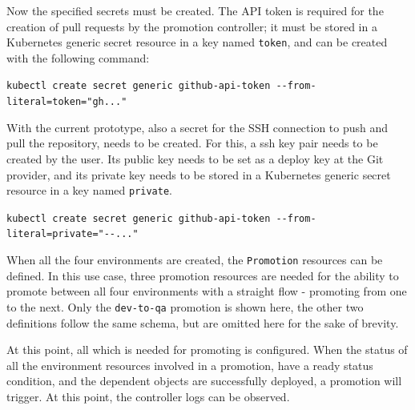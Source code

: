 %
%
%
%
%

Now the specified secrets must be created.
The API token is required for the creation of pull requests by the promotion controller;
it must be stored in a Kubernetes generic secret resource in a key named \lstinline|token|,
and can be created with the following command:

\lstinline|kubectl create secret generic github-api-token --from-literal=token="gh..."|

With the current prototype, also a secret for the SSH connection to push and pull
the repository, needs to be created.
For this, a ssh key pair needs to be created by the user. Its public key needs to 
be set as a deploy key at the Git provider,
and its private key needs to be stored in a
Kubernetes generic secret resource in a key named \lstinline|private|.

\lstinline|kubectl create secret generic github-api-token --from-literal=private="--..."|

When all the four environments are created, the \lstinline|Promotion| resources
can be defined.
In this use case, three promotion resources are needed for the ability to
promote between all four environments with a straight flow - promoting from one to the next.
Only the \lstinline|dev-to-qa| promotion is shown here,
the other two definitions follow the same schema,
but are omitted here for the sake of brevity.



%
%
%





At this point, all which is needed for promoting is configured.
When the status of all the environment resources involved in a promotion,
have a ready status condition,
and the dependent objects are successfully deployed,
a promotion will trigger.
%
At this point, the controller logs can be observed.

